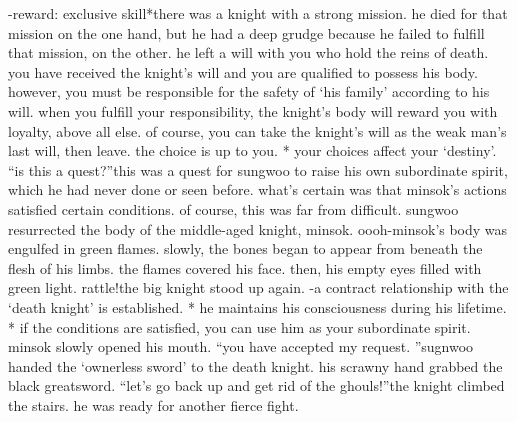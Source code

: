 -reward: exclusive skill*there was a knight with a strong mission.
 he died for that mission on the one hand, but he had a deep grudge because he failed to fulfill that mission, on the other.
 he left a will with you who hold the reins of death.
you have received the knight’s will and you are qualified to possess his body.
 however, you must be responsible for the safety of ‘his family’ according to his will.
 when you fulfill your responsibility, the knight’s body will reward you with loyalty, above all else.
of course, you can take the knight’s will as the weak man’s last will, then leave.
 the choice is up to you.
* your choices affect your ‘destiny’.
“is this a quest?”this was a quest for sungwoo to raise his own subordinate spirit, which he had never done or seen before.
 what’s certain was that minsok’s actions satisfied certain conditions.
of course, this was far from difficult.
sungwoo resurrected the body of the middle-aged knight, minsok.
oooh-minsok’s body was engulfed in green flames.
 slowly, the bones began to appear from beneath the flesh of his limbs.
 the flames covered his face.
 then, his empty eyes filled with green light.
rattle!the big knight stood up again.
-a contract relationship with the ‘death knight’ is established.
* he maintains his consciousness during his lifetime.
* if the conditions are satisfied, you can use him as your subordinate spirit.
minsok slowly opened his mouth.
“you have accepted my request.
”sugnwoo handed the ‘ownerless sword’ to the death knight.
his scrawny hand grabbed the black greatsword.
“let’s go back up and get rid of the ghouls!”the knight climbed the stairs.
 he was ready for another fierce fight.


 